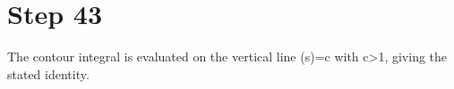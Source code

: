 \section*{Step 43}

The contour integral is evaluated on the vertical line \Re(s)=c with c>1, giving the stated identity.
